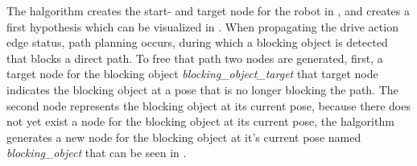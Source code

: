 The \ac{halgorithm} creates the start- and target node for the robot in , and creates a first hypothesis which can be visualized in . When propagating the drive action edge status, path planning occurs, during which a blocking object is detected that blocks a direct path. To free that path two nodes are generated, first, a target node for the blocking object \textit{blocking\_object\_target} that target node indicates the blocking object at a pose that is no longer blocking the path. The second node represents the blocking object at its current pose, because there does not yet exist a node for the blocking object at its current pose, the \ac{halgorithm} generates a new node for the blocking object at it's current pose named \textit{blocking\_object} that can be seen in .\bs

